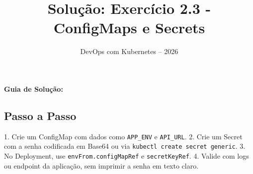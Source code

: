 \documentclass[11pt,a4paper]{article}
\title{\color{secondary}\Huge\textbf{Solução: Exercício 2.3 - ConfigMaps e Secrets}}
\author{\color{primary}DevOps com Kubernetes -- 2026}
\date{}
\begin{document}
\maketitle


\textbf{Guia de Solução:}

\subsection*{\color{secondary}Passo a Passo}

1. Crie um ConfigMap com dados como \texttt{APP\_ENV} e \texttt{API\_URL}.
2. Crie um Secret com a senha codificada em Base64 ou via \texttt{kubectl create secret generic}.
3. No Deployment, use \texttt{envFrom.configMapRef} e \texttt{secretKeyRef}.
4. Valide com logs ou endpoint da aplicação, sem imprimir a senha em texto claro.
\end{document}
